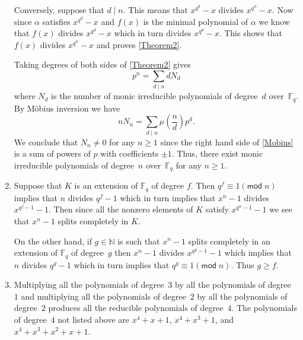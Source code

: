 \documentclass[12pt]{article}
\renewcommand{\pmod}[1]{\left(\mathsf{mod}\;#1\right)}
\begin{document}
\begin{enumerate}
Conversely, suppose that $d\mid n$. This means that $x^{q^d}-x$
divides $x^{q^n}-x$. Now since $\alpha$ satisfies $x^{q^d}-x$
and $f\left(x\right)$ is the minimal polynomial of $\alpha$
we know that $f\left(x\right)$ divides $x^{q^d}-x$ which in
turn divides $x^{q^d}-x$. This shows that $f\left(x\right)$
divides $x^{q^n}-x$ and proves \autoref{Theorem2}.

Taking degrees of both sides of \autoref{Theorem2} gives
\[p^n=\sum_{d\mid n}dN_d\]
where $N_d$ is the number of monic irreducible polynomials
of degree~$d$ over~$\mathbb{F}_q$.
By M\"obius inversion we have
\begin{equation}\label{Mobius}
nN_n=\sum_{d\mid n}\mu\left(\frac{n}{d}\right)p^d.
\end{equation}
We conclude that $N_n\ne 0$ for any $n\ge 1$ since
the right hand side of \autoref{Mobius} is a sum
of powers of $p$ with coefficients $\pm 1$.
Thus, there exist monic irreducible polynomials of degree~$n$
over~$\mathbb{F}_q$ for any $n\ge 1$.

\item %
Suppose that $K$ is an extension of $\mathbb{F}_q$ of degree $f$. Then
$q^f\equiv 1\pmod{n}$ implies that $n$ divides $q^f-1$
which in turn implies that $x^n-1$ divides $x^{q^f-1}-1$.
Then since all the nonzero elements of $K$ satisfy $x^{q^n-1}-1$
we see that $x^n-1$ splits completely in $K$.

On the other hand, if $g\in\mathbb{N}$ is such that
$x^n-1$ splits completely in an extension of $\mathbb{F}_q$
of degree~$g$ then $x^n-1$ divides $x^{q^g-1}-1$
which implies that $n$ divides $q^g-1$ which in turn implies
that $q^g\equiv 1\pmod{n}$. Thus $g\ge f$.

\item %
Multiplying all the polynomials of degree~$3$ by all the polynomials
of degree~$1$ and multiplying all the polynomials of degree~$2$
by all the polynomials of degree~$2$
produces all the reducible polynomials of degree~$4$.
The polynomials of degree~$4$ not listed above are
$x^4+x+1$, $x^4+x^3+1$, and $x^4+x^3+x^2+x+1$.
\end{enumerate}
\end{document}
